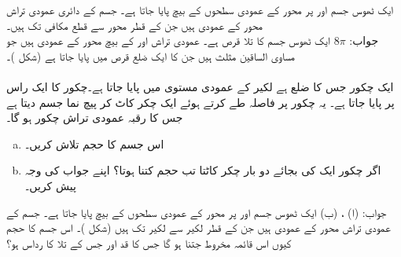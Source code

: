 ایک ٹھوس جسم  اور  پر   محور کے عمودی سطحوں کے بیچ پایا جاتا ہے۔ جسم کے دائری عمودی تراش  محور کے عمودی ہیں جن کے قطر  محور سے قطع مکافی  تک ہیں۔\\
جواب:\quad
$8\pi$
ایک ٹھوس جسم کا تلا قرص  ہے۔ عمودی تراش     اور  کے بیچ  محور کے عمودی ہیں جو مساوی الساقین مثلث ہیں جن کا ایک ضلع قرص میں پایا جاتا ہے (شکل )۔
\\
\\
ایک چکور جس کا ضلع  ہے لکیر  کے عمودی مستوی میں پایا جاتا ہے۔چکور کا ایک راس  پر پایا جاتا ہے۔ یہ چکور  پر  فاصلہ طے کرتے ہوئے ایک چکر کاٹ کر پیچ نما جسم دیتا ہے جس کا رقبہ عمودی تراش چکور ہو گا۔
\begin{enumerate}[a.]
\item
اس جسم کا حجم تلاش کریں۔
\item
اگر چکور ایک کی بجائے دو بار چکر کاٹتا تب حجم کتنا ہوتا؟ اپنے جواب کی وجہ پیش کریں۔ 
\end{enumerate} 
جواب:\quad
(ا) ، (ب) 
ایک ٹھوس جسم  اور  پر   محور کے عمودی سطحوں کے بیچ پایا جاتا ہے۔ جسم کے عمودی تراش  محور کے عمودی ہیں جن کے  قطر لکیر  سے لکیر  تک ہیں (شکل )۔ اس جسم کا حجم کیوں اس قائمہ مخروط جتنا ہو گا جس کا قد  اور جس کے تلا کا رداس  ہو؟ 
